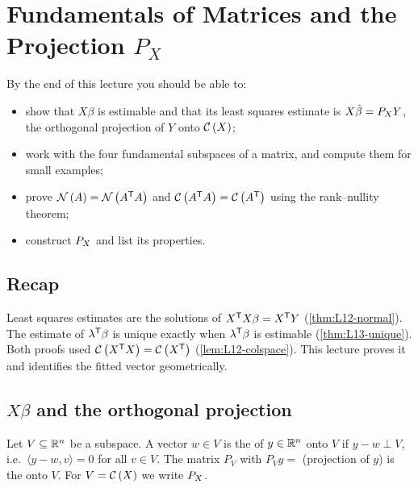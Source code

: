 \section{Fundamentals of Matrices and the Projection $P_X$}\label{sec:L14}


\begin{guiding*}
By the end of this lecture you should be able to:
\begin{itemize}
  \item show that $X\beta$ is estimable and that its least squares estimate is $X\hat\beta=P_X Y$, the orthogonal projection of $Y$ onto $\mathcal{C}\left(X\right)$;
  \item work with the four fundamental subspaces of a matrix, and compute them for small examples;
  \item prove $\mathcal{N}\left(A\right)=\mathcal{N}\left(A^{\mathsf T} A\right)$ and $\mathcal{C}\left(A^{\mathsf T} A\right)=\mathcal{C}\left(A^{\mathsf T}\right)$ using the rank--nullity theorem;
  \item construct $P_X$ and list its properties.
\end{itemize}
\end{guiding*}

\subsection{Recap}
Least squares estimates are the solutions of $X^{\mathsf T} X\beta=X^{\mathsf T} Y$ (\cref{thm:L12-normal}). The estimate of $\lambda^{\mathsf T}\beta$
is unique exactly when $\lambda^{\mathsf T}\beta$ is estimable (\cref{thm:L13-unique}). Both proofs used
$\mathcal{C}\left(X^{\mathsf T} X\right)=\mathcal{C}\left(X^{\mathsf T}\right)$ (\cref{lem:L12-colspace}). This lecture proves it and identifies the fitted vector
geometrically.

\subsection{$X\beta$ and the orthogonal projection}
\begin{definition}\label{def:L14-proj}
Let $V\subseteq\mathbb R^n$ be a subspace. A vector $w\in V$ is the  of $y\in\mathbb R^n$ onto $V$ if
$y-w\perp V$, i.e.\ $\langle y-w,v\rangle=0$ for all $v\in V$. The matrix $P_V$ with $P_Vy=$ (projection of $y$) is the
 onto $V$. For $V=\mathcal{C}\left(X\right)$ we write $P_X$.
\end{definition}

